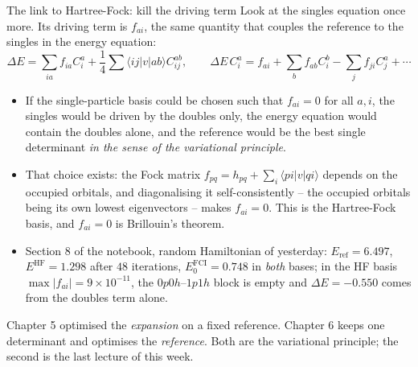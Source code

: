 \documentclass[aspectratio=169,10pt]{beamer}
\newcommand{\mbbox}[1]{%
  \begin{tcolorbox}[colback=paleblue,colframe=uioblue,title={\bfseries Many-body connection}]
  #1
  \end{tcolorbox}}
\newcommand{\element}[3]{\langle #1\vert #2\vert #3\rangle}
\begin{document}
\begin{frame}{The link to Hartree-Fock: kill the driving term}
  \footnotesize
  Look at the singles equation once more. Its driving term is $f_{ai}$, the same quantity that couples the reference to the singles in the energy equation:
  \[
    \Delta E=\sum_{ia}f_{ia}C_i^a+\frac14\sum\element{ij}{v}{ab}C_{ij}^{ab},
    \qquad
    \Delta E\,C_i^a=f_{ai}+\sum_bf_{ab}C_i^b-\sum_jf_{ji}C_j^a+\cdots
  \]
  \begin{itemize}
    \item If the single-particle basis could be chosen such that $f_{ai}=0$ for all $a,i$, the singles would be driven by the doubles only, the energy equation would contain the doubles alone, and the reference would be the best single determinant \emph{in the sense of the variational principle}.
    \item That choice exists: the Fock matrix $f_{pq}=h_{pq}+\sum_i\element{pi}{v}{qi}$ depends on the occupied orbitals, and diagonalising it self-consistently -- the occupied orbitals being its own lowest eigenvectors -- makes $f_{ai}=0$. This is the \alert{Hartree-Fock} basis, and $f_{ai}=0$ is \alert{Brillouin's theorem}.
    \item Section 8 of the notebook, random Hamiltonian of yesterday: $E_{\mathrm{ref}}=6.497$, $E^{\mathrm{HF}}=1.298$ after $48$ iterations, $E_0^{\mathrm{FCI}}=0.748$ in \emph{both} bases; in the HF basis $\max|f_{ai}|=9\times10^{-11}$, the $0p0h$--$1p1h$ block is empty and $\Delta E=-0.550$ comes from the doubles term alone.
  \end{itemize}
  \mbbox{\footnotesize Chapter 5 optimised the \emph{expansion} on a fixed reference. Chapter 6 keeps one determinant and optimises the \emph{reference}. Both are the variational principle; the second is the last lecture of this week.}
\end{frame}
\end{document}
